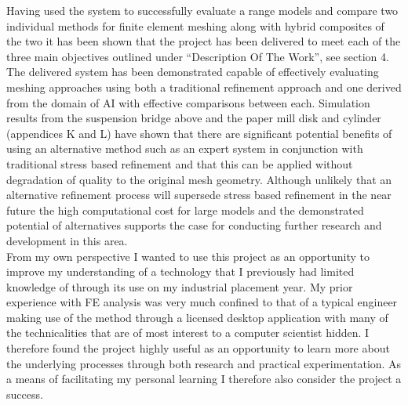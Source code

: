 
\noindent
Having used the system to successfully evaluate a range models and compare two individual methods for finite element meshing along with hybrid composites of the two it has been shown that the project has been delivered to meet each of the three main objectives outlined under ``Description Of The Work'', see section 4. The delivered system has been demonstrated capable of effectively evaluating meshing approaches using both a traditional refinement approach and one derived from the domain of AI with effective comparisons between each. Simulation results from the suspension bridge above and the paper mill disk and cylinder (appendices K and L) have shown that there are significant potential benefits of using an alternative method such as an expert system in conjunction with traditional stress based refinement and that this can be applied without degradation of quality to the original mesh geometry. Although unlikely that an alternative refinement process will supersede stress based refinement in the near future the high computational cost for large models and the demonstrated potential of alternatives supports the case for conducting further research and development in this area. \\


\noindent
From my own perspective I wanted to use this project as an opportunity to improve my understanding of a technology that I previously had limited knowledge of through its use on my industrial placement year. My prior experience with FE analysis was very much confined to that of a typical engineer making use of the method through a licensed desktop application with many of the technicalities that are of most interest to a computer scientist hidden. I therefore found the project highly useful as an opportunity to learn more about the underlying processes through both research and practical experimentation. As a means of facilitating my personal learning  I therefore also consider the project a success. \\ 


